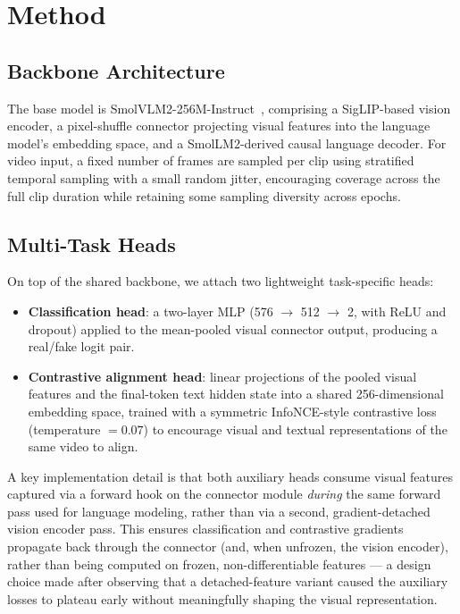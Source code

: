 \documentclass[acmsmall,review=false]{acmart}
\begin{document}
\section{Method}
\label{sec:method}

\subsection{Backbone Architecture}

The base model is SmolVLM2-256M-Instruct~\citep{marafioti2025smolvlm}, comprising
a SigLIP-based vision encoder, a pixel-shuffle connector projecting visual
features into the language model's embedding space, and a SmolLM2-derived causal
language decoder. For video input, a fixed number of frames are sampled per clip
using stratified temporal sampling with a small random jitter, encouraging
coverage across the full clip duration while retaining some sampling diversity
across epochs.

\subsection{Multi-Task Heads}

On top of the shared backbone, we attach two lightweight task-specific heads:

\begin{itemize}[nosep]
    \item \textbf{Classification head}: a two-layer MLP (576 $\rightarrow$ 512
    $\rightarrow$ 2, with ReLU and dropout) applied to the mean-pooled visual
    connector output, producing a real/fake logit pair.
    \item \textbf{Contrastive alignment head}: linear projections of the pooled
    visual features and the final-token text hidden state into a shared
    256-dimensional embedding space, trained with a symmetric InfoNCE-style
    contrastive loss (temperature $= 0.07$) to encourage visual and textual
    representations of the same video to align.
\end{itemize}

A key implementation detail is that both auxiliary heads consume visual
features captured via a forward hook on the connector module \emph{during} the
same forward pass used for language modeling, rather than via a second,
gradient-detached vision encoder pass. This ensures classification and
contrastive gradients propagate back through the connector (and, when unfrozen,
the vision encoder), rather than being computed on frozen, non-differentiable
features --- a design choice made after observing that a detached-feature
variant caused the auxiliary losses to plateau early without meaningfully
shaping the visual representation.
\end{document}
